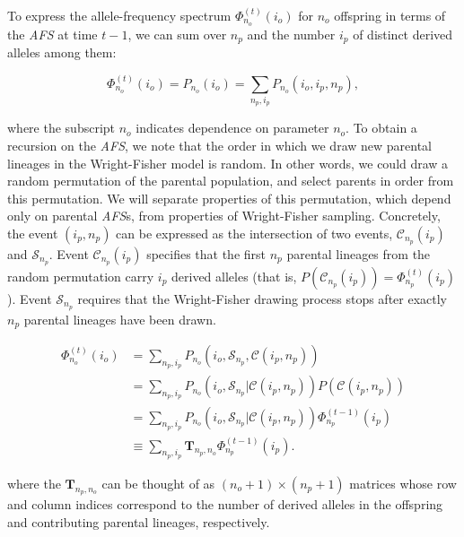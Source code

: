 \documentclass[review]{elsarticle}
\newcommand{\afs}[2]{\Phi_{#1}^{(#2)}}
\begin{document}
To express the allele-frequency spectrum $\afs{n_o}{t}(i_o)$ for $n_o$ offspring in terms of the
\textit{AFS} at time $t-1$, we can sum over $n_p$ and the number $i_p$ of distinct derived alleles among them:


\begin{equation}
\afs{n_o}{t}(i_o)=P_{n_o} (i_o) =\sum_{n_p,i_p} P_{n_o}(i_o,i_p,n_p),
\end{equation}

where the subscript $n_o$ indicates dependence on parameter $n_o$. To obtain a recursion on the
\textit{AFS}, we note that the order in which we draw new parental lineages in the Wright-Fisher
model is random. In other words, we could draw a random permutation of the parental population, and
select parents in order from this permutation. We will separate properties of this permutation,
which depend only on parental \textit{AFS}s, from properties of Wright-Fisher sampling. Concretely,
the event $(i_p,n_p)$ can be expressed as the intersection of two events, $\mathcal{C}_{n_p}(i_p)$
and $\mathcal{S}_{n_p}$. Event $\mathcal{C}_{n_p}(i_p)$ specifies that the first $n_p$ parental
lineages from the random permutation carry $i_p$ derived alleles (that is,
$P(\mathcal{C}_{n_p}(i_p)) =\afs{n_p}{t} (i_p)$). Event $\mathcal{S}_{n_p}$ requires that the
Wright-Fisher drawing process stops after exactly $n_p$ parental lineages have been drawn.

\begin{equation}
\begin{split}
\afs{n_o}{t}(i_o)&= \sum_{n_p,i_p} P_{n_o}(i_o, \mathcal{S}_{n_p}, \mathcal{C}(i_p,n_p) )\\
&=   \sum_{n_p,i_p} P_{n_o}(i_o, \mathcal{S}_{n_p}| \mathcal{C}(i_p,n_p) ) P(\mathcal{C}(i_p,n_p))\\
&=   \sum_{n_p,i_p} P_{n_o}(i_o, \mathcal{S}_{n_p}| \mathcal{C}(i_p,n_p) )  \afs{n_p}{t-1}(i_p)\\
&\equiv  \sum_{n_p,i_p}  \mathbf{T}_{n_p,n_o}     \afs{n_p}{t-1}(i_p).
\end{split}
\label{eq:recur}
\end{equation}

where the $\mathbf{T}_{n_p,n_o}$ can be thought of as $(n_o+1) \times (n_p+1)$ matrices whose row
and column indices correspond to the number of derived alleles in the offspring and contributing
parental lineages, respectively.
\end{document}
